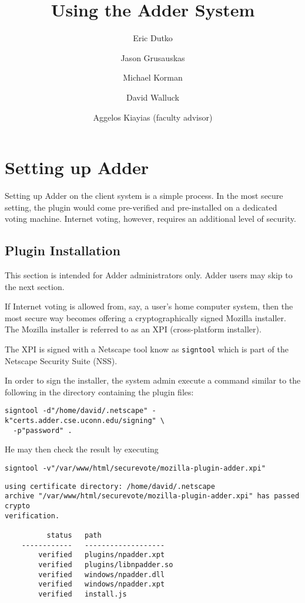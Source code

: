 \documentclass[letterpaper,10pt]{article}
\title{Using the Adder System}
\author{Eric Dutko \and Jason Grusauskas \and Michael Korman
\and David Walluck \and Aggelos Kiayias (faculty advisor)}
\begin{document}
\maketitle

\section{Setting up Adder}

Setting up Adder on the client system is a simple process. In the
most secure setting, the plugin would come pre-verified and
pre-installed on a dedicated voting machine. Internet voting,
however, requires an additional level of security.

\subsection{Plugin Installation}

This section is intended for Adder administrators only. Adder users
may skip to the next section.

If Internet voting is allowed from, say, a user's home computer
system, then the most secure way becomes offering a
cryptographically signed Mozilla installer. The Mozilla installer is
referred to as an XPI (cross-platform installer).

The XPI is signed with a Netscape tool know as \texttt{signtool}
which is part of the Netscape Security Suite (NSS).

In order to sign the installer, the system admin execute a command
similar to the following in the directory containing the plugin
files:

\begin{footnotesize}
\begin{verbatim}
signtool -d"/home/david/.netscape" -k"certs.adder.cse.uconn.edu/signing" \
  -p"password" .
\end{verbatim}
\end{footnotesize}

He may then check the result by executing

\begin{footnotesize}
\begin{verbatim}
signtool -v"/var/www/html/securevote/mozilla-plugin-adder.xpi"
\end{verbatim}
\end{footnotesize}

\begin{footnotesize}
\begin{verbatim}
using certificate directory: /home/david/.netscape
archive "/var/www/html/securevote/mozilla-plugin-adder.xpi" has passed crypto
verification.

          status   path
    ------------   -------------------
        verified   plugins/npadder.xpt
        verified   plugins/libnpadder.so
        verified   windows/npadder.dll
        verified   windows/npadder.xpt
        verified   install.js
\end{verbatim}
\end{footnotesize}
\end{document}

